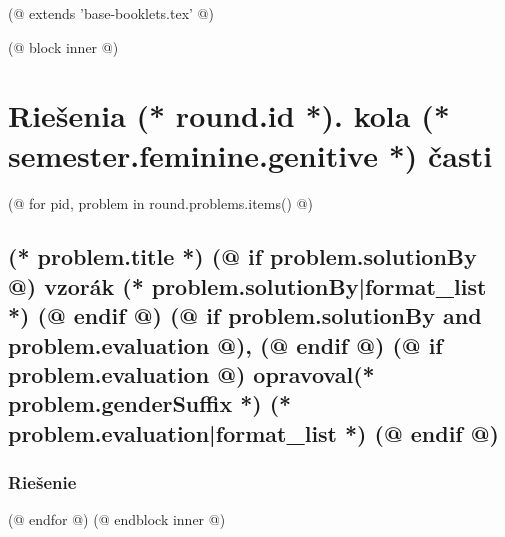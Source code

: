 (@ extends 'base-booklets.tex' @)

(@ block inner @)
    \pagestyle{seminar-booklet-body}

    \section{\texorpdfstring{Riešenia (* round.id *). kola (* semester.feminine.genitive *) časti}{Riešenia}}

    (@ for pid, problem in round.problems.items() @)%
        \setcounter{volume}{(* volume.number *)}%
        \setcounter{semester}{(* semester.number *)}%
        \setcounter{round}{(* round.number *)}%
        \setcounter{problem}{(* problem.number *)}%

        \subsection{%
            \texorpdfstring{%
                \large \textbf{(* problem.title *)} \hfill \normalsize%
                (@ if problem.solutionBy @)%
                    vzorák (* problem.solutionBy|format_list *)%
                (@ endif @)%
                (@ if problem.solutionBy and problem.evaluation @), (@ endif @)%
                (@ if problem.evaluation @)%
                    opravoval(* problem.genderSuffix *) (* problem.evaluation|format_list *)%
                (@ endif @)%
            }{(* round.number *).(* problem.number *) (* problem.title *)}%
        }

        \subsubsection{Riešenie}
    (@ endfor @)
(@ endblock inner @)
